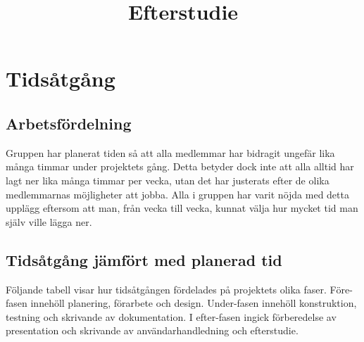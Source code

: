 \documentclass[a4paper,12pt]{article}
\title{Efterstudie}
\renewcommand{\thepage}{\roman{page}}
\begin{document}
\LIPStitelsida

\begin{LIPSprojektidentitet}
\end{LIPSprojektidentitet}


\renewcommand*\contentsname{Innehåll}
\begin{spacing}{0.5}
\tableofcontents{}
\end{spacing}
\newpage

\begin{LIPSdokumenthistorik}
\end{LIPSdokumenthistorik}
\newpage

\renewcommand{\thepage}{\arabic{page}}
\setcounter{page}{1}

\section{Tidsåtgång}
\subsection{Arbetsfördelning}
Gruppen har planerat tiden så att alla medlemmar har bidragit ungefär lika många timmar under projektets gång. Detta betyder dock inte att alla alltid har lagt ner lika många timmar per vecka, utan det har justerats efter de olika medlemmarnas möjligheter att jobba. Alla i gruppen har varit nöjda med detta upplägg eftersom att man, från vecka till vecka, kunnat välja hur mycket tid man själv ville lägga ner.

\subsection{Tidsåtgång jämfört med planerad tid}
Följande tabell visar hur tidsåtgången fördelades på projektets olika faser. Före-fasen innehöll planering, förarbete och design. Under-fasen innehöll konstruktion, testning och skrivande av dokumentation. I efter-fasen ingick förberedelse av presentation och skrivande av användarhandledning och efterstudie.
\end{document}

